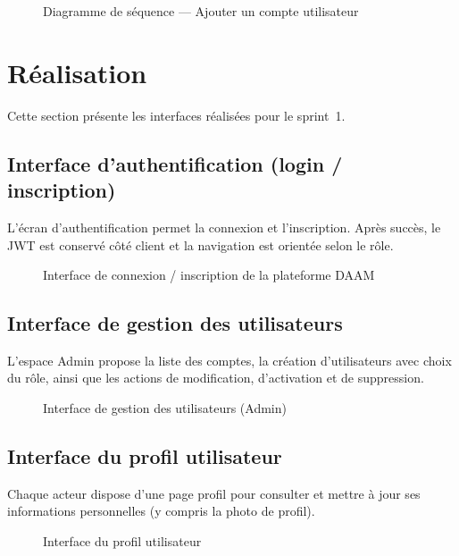 \begin{figure}[htbp]
  \centering
  \caption{Diagramme de s\'equence --- Ajouter un compte utilisateur}
  \label{fig:seq-add-user}
\end{figure}


\section{Réalisation}

Cette section présente les interfaces réalisées pour le sprint~1.

\subsection{Interface d'authentification (login / inscription)}

L'écran d'authentification permet la connexion et l'inscription. Après succès,
le JWT est conservé côté client et la navigation est orientée selon le rôle.

\begin{figure}[htbp]
  \centering
  \caption{Interface de connexion / inscription de la plateforme DAAM}
  \label{fig:ui-login}
\end{figure}


\subsection{Interface de gestion des utilisateurs}

L'espace Admin propose la liste des comptes, la création d'utilisateurs avec
choix du rôle, ainsi que les actions de modification, d'activation et de
suppression.

\begin{figure}[htbp]
  \centering
  \caption{Interface de gestion des utilisateurs (Admin)}
  \label{fig:ui-users}
\end{figure}


\subsection{Interface du profil utilisateur}

Chaque acteur dispose d'une page profil pour consulter et mettre à jour ses
informations personnelles (y compris la photo de profil).

\begin{figure}[htbp]
  \centering
  \caption{Interface du profil utilisateur}
  \label{fig:ui-profile}
\end{figure}


